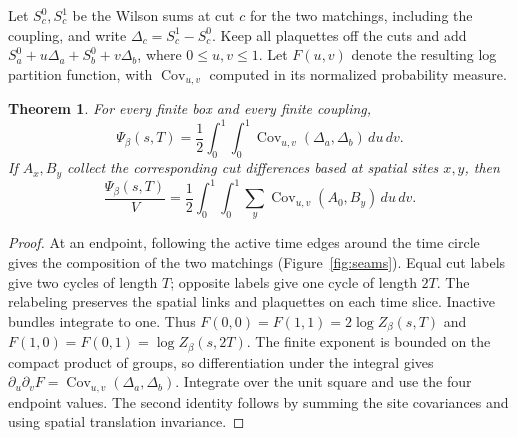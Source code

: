 \documentclass[11pt]{amsart}
\newtheorem{theorem}{Theorem}
\newcommand{\Cov}{\operatorname{Cov}}
\begin{document}
Let \(S_c^0,S_c^1\) be the Wilson sums at cut \(c\) for the two matchings,
including the coupling, and write \(\Delta_c=S_c^1-S_c^0\).
Keep all plaquettes off the cuts and add
\(S_a^0+u\Delta_a+S_b^0+v\Delta_b\), where \(0\le u,v\le1\).
Let \(F(u,v)\) denote the resulting log partition function, with
\(\Cov_{u,v}\) computed in its normalized probability measure.

\begin{theorem}
For every finite box and every finite coupling,
\[
 \Psi_\beta(s,T)
   =\frac12\int_0^1\!\!\int_0^1\Cov_{u,v}(\Delta_a,\Delta_b)\,du\,dv.
\]
If \(A_x,B_y\) collect the corresponding cut differences based at spatial
sites \(x,y\), then
\[
 \frac{\Psi_\beta(s,T)}{V}
   =\frac12\int_0^1\!\!\int_0^1
      \sum_y\Cov_{u,v}(A_0,B_y)\,du\,dv.                   \tag{1}
\]
\end{theorem}

\begin{proof}
At an endpoint, following the active time edges around the time circle
gives the composition of the two matchings (Figure~\ref{fig:seams}). Equal cut labels give two
cycles of length \(T\); opposite labels give one cycle of length \(2T\).
The relabeling preserves the spatial links and plaquettes on each time
slice. Inactive bundles integrate to one. Thus \(F(0,0)=F(1,1)=2\log
Z_\beta(s,T)\) and \(F(1,0)=F(0,1)=\log Z_\beta(s,2T)\).
The finite exponent is bounded on the compact product of groups, so
differentiation under the integral gives
\(\partial_u\partial_v F=\Cov_{u,v}(\Delta_a,\Delta_b)\).
Integrate over the unit square and use the four endpoint values.
The second identity follows by summing the site covariances and using
spatial translation invariance.
\end{proof}
\end{document}
